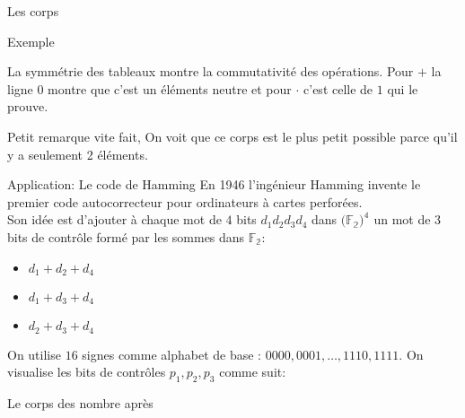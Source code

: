 \begin{parag}{Les corps}
\begin{subparag}{Exemple}
\begin{center}
        \end{center}


        \begin{framedremark}
            La symmétrie des tableaux montre la commutativité des opérations. Pour $+$ la ligne $0$ montre que c'est un éléments neutre et pour $\cdot$ c'est celle de $1$ qui le prouve.
        \end{framedremark}
        \begin{framedremark}
            Petit remarque vite fait, On voit que ce corps est le plus petit possible parce qu'il y a seulement 2 éléments.
        \end{framedremark}
    \end{subparag}

\end{parag}

\begin{parag}{Application: Le code de Hamming}
    En 1946 l'ingénieur Hamming invente le premier code autocorrecteur pour ordinateurs à cartes perforées.
    \\
    Son idée est d'ajouter à chaque mot de $4$ bits $d_1d_2d_3d_4$ dans $(\mathbb{F_2)^4}$ un mot de 
    3 bits de contrôle formé par les sommes dans $\mathbb{F_2}$:
    \begin{itemize}
        \item $d_1 + d_2 + d_4$
        \item $d_1 + d_3 + d_4$
        \item $d_2 +d_3 + d_4$
    \end{itemize}
    On utilise $16$ signes comme alphabet de base : $0000, 0001, \dots, 1110, 1111$. On visualise les bits de contrôles $p_1, p_2, p_3$ comme suit:
\end{parag}

\begin{parag}{Le corps des nombre}
    après
\end{parag}

